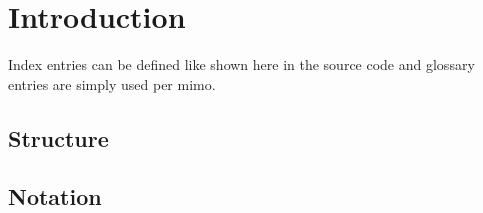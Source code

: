 \chapter{Introduction}
\label{chap:introduction}
Index entries can be defined like shown here in the source code and
 glossary entries are simply used per \ac{mimo}.
\section{Structure}
\label{sec:structure}


\section{Notation}
\label{sec:notation}


